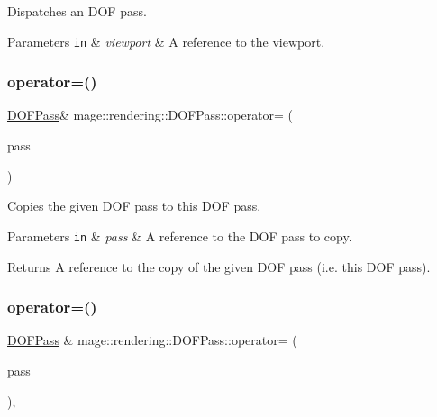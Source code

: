 Dispatches an D\+OF pass.


\begin{DoxyParams}[1]{Parameters}
\mbox{\tt in}  & {\em viewport} & A reference to the viewport. \\
\hline
\end{DoxyParams}
\hypertarget{classmage_1_1rendering_1_1_d_o_f_pass_ac70bc446c50db4ab919220a344be8045}{}\label{classmage_1_1rendering_1_1_d_o_f_pass_ac70bc446c50db4ab919220a344be8045} 
\subsubsection{\texorpdfstring{operator=()}{operator=()}\hspace{0.1cm}{\footnotesize\ttfamily [1/2]}}
{\footnotesize\ttfamily \hyperlink{classmage_1_1rendering_1_1_d_o_f_pass}{D\+O\+F\+Pass}\& mage\+::rendering\+::\+D\+O\+F\+Pass\+::operator= (\begin{DoxyParamCaption}\item[{const \hyperlink{classmage_1_1rendering_1_1_d_o_f_pass}{D\+O\+F\+Pass} \&}]{pass }\end{DoxyParamCaption})\hspace{0.3cm}{\ttfamily [delete]}}

Copies the given D\+OF pass to this D\+OF pass.


\begin{DoxyParams}[1]{Parameters}
\mbox{\tt in}  & {\em pass} & A reference to the D\+OF pass to copy. \\
\hline
\end{DoxyParams}
\begin{DoxyReturn}{Returns}
A reference to the copy of the given D\+OF pass (i.\+e. this D\+OF pass). 
\end{DoxyReturn}
\hypertarget{classmage_1_1rendering_1_1_d_o_f_pass_a4155c31b1fe485edf5c7c3b635b737d0}{}\label{classmage_1_1rendering_1_1_d_o_f_pass_a4155c31b1fe485edf5c7c3b635b737d0} 
\subsubsection{\texorpdfstring{operator=()}{operator=()}\hspace{0.1cm}{\footnotesize\ttfamily [2/2]}}
{\footnotesize\ttfamily \hyperlink{classmage_1_1rendering_1_1_d_o_f_pass}{D\+O\+F\+Pass} \& mage\+::rendering\+::\+D\+O\+F\+Pass\+::operator= (\begin{DoxyParamCaption}\item[{\hyperlink{classmage_1_1rendering_1_1_d_o_f_pass}{D\+O\+F\+Pass} \&\&}]{pass }\end{DoxyParamCaption})\hspace{0.3cm}{\ttfamily [default]}, {\ttfamily [noexcept]}}

